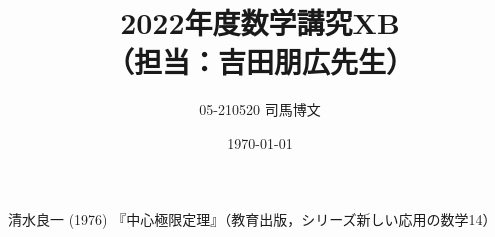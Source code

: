 \documentclass[uplatex,dvipdfmx]{jsarticle}
\title{2022年度数学講究XB\\（担当：吉田朋広先生）}
\author{05-210520 司馬博文}
\date{\today}
\begin{document}
\maketitle

\begin{thebibliography}{9}
    清水良一 (1976) 『中心極限定理』（教育出版，シリーズ新しい応用の数学14）
\end{thebibliography}
\end{document}
